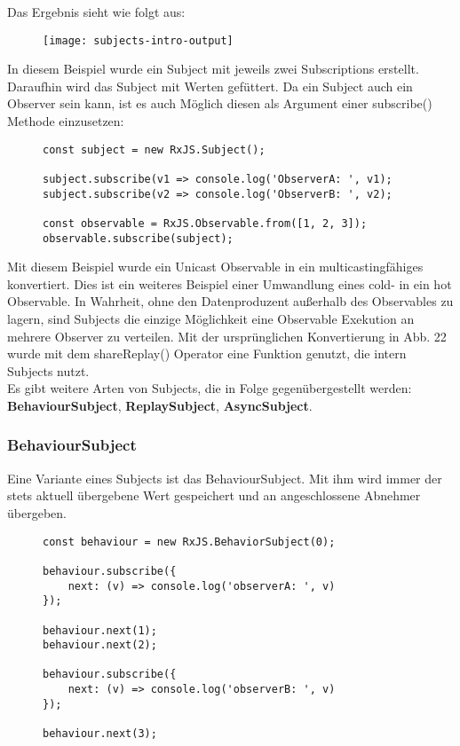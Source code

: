 \noindent
Das Ergebnis sieht wie folgt aus:

\begin{figure}[H]
\centering
\texttt{[image: subjects-intro-output]}
\end{figure}

\noindent
In diesem Beispiel wurde ein Subject mit jeweils zwei Subscriptions erstellt. Daraufhin wird das Subject mit Werten \glqq gefüttert\grqq. Da ein Subject auch ein Observer sein kann, ist es auch Möglich diesen als Argument einer subscribe() Methode einzusetzen:

\begin{figure}[H]
\begin{lstlisting}[basicstyle=\small]
const subject = new RxJS.Subject();

subject.subscribe(v1 => console.log('ObserverA: ', v1);
subject.subscribe(v2 => console.log('ObserverB: ', v2);

const observable = RxJS.Observable.from([1, 2, 3]);
observable.subscribe(subject);
\end{lstlisting}
\end{figure}


\noindent
Mit diesem Beispiel wurde ein Unicast Observable in ein multicastingfähiges konvertiert. Dies ist ein weiteres Beispiel einer Umwandlung eines cold- in ein hot Observable. In Wahrheit, ohne den Datenproduzent außerhalb des Observables zu lagern, sind Subjects die einzige Möglichkeit eine Observable Exekution an mehrere Observer zu verteilen. Mit der ursprünglichen Konvertierung in Abb. 22 wurde mit dem shareReplay() Operator eine Funktion genutzt, die intern Subjects nutzt.\\

\noindent
Es gibt weitere Arten von Subjects, die in Folge gegenübergestellt werden: \textbf{BehaviourSubject}, \textbf{ReplaySubject}, \textbf{AsyncSubject}.

\subsubsection{BehaviourSubject}

Eine Variante eines Subjects ist das BehaviourSubject. Mit ihm wird immer der stets aktuell übergebene Wert gespeichert und an angeschlossene Abnehmer übergeben.

\begin{figure}[H]
\begin{lstlisting}[basicstyle=\small]
const behaviour = new RxJS.BehaviorSubject(0);

behaviour.subscribe({
    next: (v) => console.log('observerA: ', v)
});

behaviour.next(1);
behaviour.next(2);

behaviour.subscribe({
    next: (v) => console.log('observerB: ', v)
});

behaviour.next(3);
\end{lstlisting}
\end{figure}

